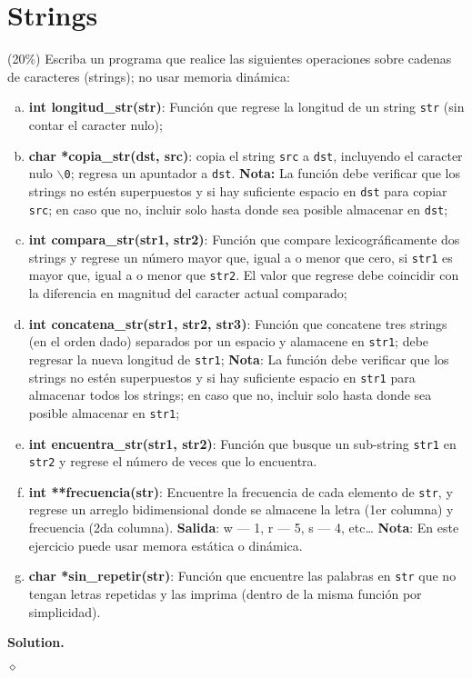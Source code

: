 \documentclass{article}
\theoremstyle{problemstyle}
\newenvironment{solution}{%
  \begin{mdframed}[linewidth=0.8pt,linecolor=Gray,backgroundcolor=Gray!5,roundcorner=5pt, nobreak=true]%
  \noindent\textbf{Solution.}%
}{%
\hfill $ \diamond $ 
  \end{mdframed}%
}
\begin{document}
\section*{Strings}\label{sec:strings} %

\begin{problem}
(20\%) Escriba un programa que realice las siguientes operaciones sobre cadenas de caracteres (strings); no usar memoria din\'amica:
\begin{enumerate}[a)]
	\item \textbf{int longitud\_str(str)}: Funci\'on que regrese la longitud de un string \texttt{str} (sin contar el caracter nulo);
	\item \textbf{char *copia\_str(dst, src)}: copia el string \texttt{src} a \texttt{dst}, incluyendo el caracter nulo $\backslash$\texttt{0}; regresa un apuntador a \texttt{dst}.
	      \textbf{Nota:} La funci\'on debe verificar que los strings no est\'en superpuestos y si hay suficiente espacio en \texttt{dst} para copiar \texttt{src}; en caso que no, incluir solo hasta donde sea posible almacenar en \texttt{dst};
	\item \textbf{int compara\_str(str1, str2)}: Funci\'on que compare lexicogr\'aficamente dos strings y regrese un n\'umero mayor que, igual a o menor que cero, si \texttt{str1} es mayor que, igual a o menor que \texttt{str2}. El valor que regrese debe coincidir con la diferencia en magnitud del caracter actual comparado;
	\item \textbf{int concatena\_str(str1, str2, str3)}: Funci\'on que concatene tres strings (en el orden dado) separados por un espacio y alamacene en \texttt{str1}; debe regresar la nueva longitud de \texttt{str1};
	      \textbf{Nota}: La funci\'on debe verificar que los strings no est\'en superpuestos y si hay suficiente espacio en \texttt{str1} para almacenar todos los strings; en caso que no, incluir solo hasta donde sea posible almacenar en \texttt{str1};
	\item \textbf{int encuentra\_str(str1, str2)}: Funci\'on que busque un sub-string \texttt{str1} en \texttt{str2} y regrese el n\'umero de veces que lo encuentra.
	\item \textbf{int **frecuencia(str)}: Encuentre la frecuencia de cada elemento de \texttt{str}, y regrese un arreglo bidimensional donde se almacene la letra (1er columna) y frecuencia (2da columna).
	      \textbf{Salida}: w --- 1, r --- 5, s --- 4, etc\dots
	      \textbf{Nota}: En este ejercicio puede usar memora est\'atica o din\'amica.

	\item \textbf{char *sin\_repetir(str)}: Funci\'on que encuentre las palabras en \texttt{str} que no tengan letras repetidas y las imprima (dentro de la misma funci\'on por simplicidad).
\end{enumerate}
\end{problem}
\begin{solution}

\end{solution}
\end{document}
